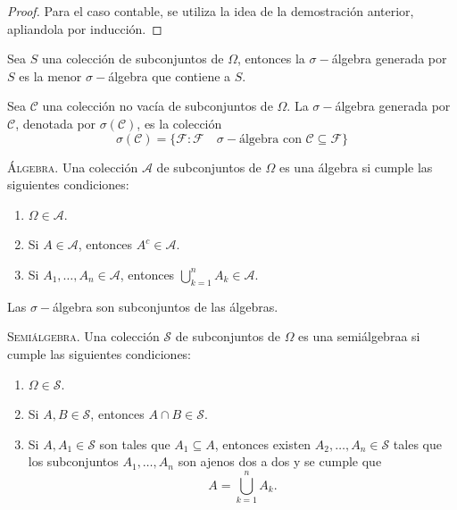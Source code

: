 \begin{proof}
	Para el caso contable, se utiliza la idea de la demostración anterior, apliandola por inducción.
\end{proof}


\begin{definicion}
	Sea $S$ una colección de subconjuntos de $\Omega$, entonces la $\sigma -$álgebra generada por $S$ es la menor $\sigma -$álgebra que contiene a $S$.
\end{definicion}



\begin{definicion}
	Sea $\mathscr{C}$ una colección no vacía de subconjuntos de $\Omega$. La $\sigma -$álgebra generada por $\mathscr{C}$, denotada por $\sigma (\mathscr{C})$, es la colección 
		$$\sigma (\mathscr{C}) = \{ \mathscr{F}:\mathscr{F} \quad \sigma -\text{álgebra con } \mathscr{C}\subseteq \mathscr{F} \}$$
\end{definicion}



\begin{definicion}
	{\scshape{Álgebra.}} Una colección $\mathscr{A}$ de subconjuntos de $\Omega$ es una álgebra si cumple las siguientes condiciones:
	\begin{enumerate}
		\item $\Omega \in \mathscr{A}$.
		\item Si $A \in \mathscr{A}$, entonces $A^c \in \mathscr{A}$.
		\item Si $A_1 ,\ldots , A_n \in \mathscr{A}$, entonces $\displaystyle\bigcup _{k=1} ^n A_k \in \mathscr{A}$.
	\end{enumerate}
\end{definicion}
Las $\sigma -$álgebra son subconjuntos de las álgebras.

\begin{definicion}
	{\scshape{Semiálgebra.}} Una colección $\mathscr{S}$ de subconjuntos de $\Omega$ es una semiálgebraa si cumple las siguientes condiciones:
	\begin{enumerate}
		\item $\Omega \in \mathscr{S}$.
		\item Si $A,B\in \mathscr{S}$, entonces $A\cap B \in \mathscr{S}$.
		\item Si $A,A_1 \in \mathscr{S}$ son tales que $A_1 \subseteq A$, entonces existen $A_2 ,\ldots ,A_n \in \mathscr{S}$ tales que los subconjuntos $A_1 ,\ldots ,A_n$ son ajenos dos a dos y se cumple que
			$$A = \bigcup _{k=1} ^n A_k .$$
	\end{enumerate}
\end{definicion}












